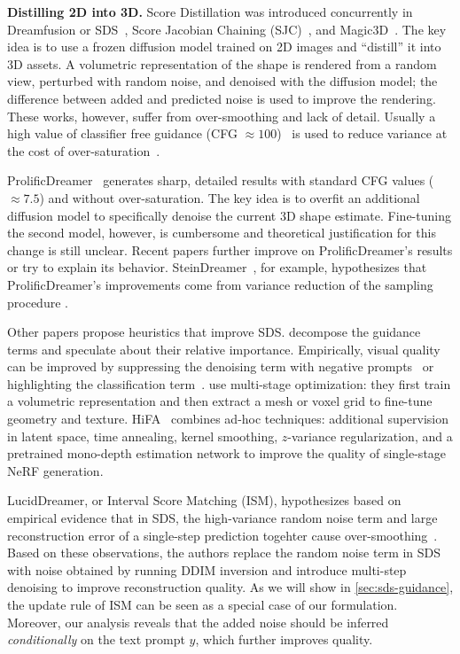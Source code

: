 \documentclass{article}
\newcommand{\al}[1]{{\color{blue}#1}}
\begin{document}
\textbf{Distilling 2D into 3D.} 
%
Score Distillation was introduced concurrently in Dreamfusion or SDS~\cite{poole2022dreamfusion}, Score Jacobian Chaining (SJC)~\cite{wang2023score}, and Magic3D~\cite{lin2023magic3d}.
%
The key idea is to use a frozen diffusion model trained on 2D images and ``distill'' it into 3D assets.
A volumetric representation of the shape is rendered from a random view, perturbed with random noise, and denoised with the diffusion model; the difference between added and predicted noise is used to improve the rendering.
These works, however, suffer from over-smoothing and lack of detail.
Usually a high value of classifier free guidance (CFG $\approx100$)~\cite{ho2022classifier} is used to reduce variance at the cost of over-saturation~\cite{lin2024common}.


ProlificDreamer~\cite{wang2024prolificdreamer} generates sharp, detailed results with standard CFG values ($\approx 7.5$) and without over-saturation.
The key idea is to overfit an additional diffusion model to specifically denoise the current 3D shape estimate.
Fine-tuning the second model, however, is cumbersome and theoretical justification for this change is still unclear.
Recent papers further improve on ProlificDreamer's results or try to explain its behavior. 
SteinDreamer~\cite{wang2023steindreamer}, for example, hypothesizes that ProlificDreamer's improvements come from variance reduction of the sampling procedure \cite{roeder2017sticking}.
%

Other papers propose heuristics that improve SDS. 
\cite{katzir2023noise, yu2023text, tang2023stable} decompose the guidance terms and speculate about their relative importance.
Empirically, visual quality can be improved by suppressing the denoising term with negative prompts~\cite{katzir2023noise} or highlighting the classification term~\cite{yu2023text}. 
%
\cite{lin2023magic3d, tang2023make, wang2024prolificdreamer, chen2024it3d} use multi-stage optimization: they first train a volumetric representation and then extract a mesh or voxel grid to fine-tune geometry and texture. 
%
HiFA~\cite{zhu2023hifa} combines ad-hoc techniques: additional supervision in latent space, time annealing, kernel smoothing, $z$-variance regularization, 
and a pretrained mono-depth estimation network 
to improve the quality of single-stage NeRF generation.
%

LucidDreamer, or Interval Score Matching (ISM), hypothesizes based on empirical evidence that in SDS, the high-variance random noise term and large reconstruction error of a single-step prediction togehter cause over-smoothing~\cite{liang2023luciddreamer}.
Based on these observations, the authors replace the random noise term in SDS with noise obtained by running DDIM inversion and introduce multi-step denoising to improve reconstruction quality. 
As we will show in \cref{sec:sds-guidance}, the update rule of ISM can be seen as a special case of our formulation.
Moreover, our analysis reveals that the added noise should be inferred \textit{conditionally} on the text prompt $y$, which further improves quality.  
\end{document}
